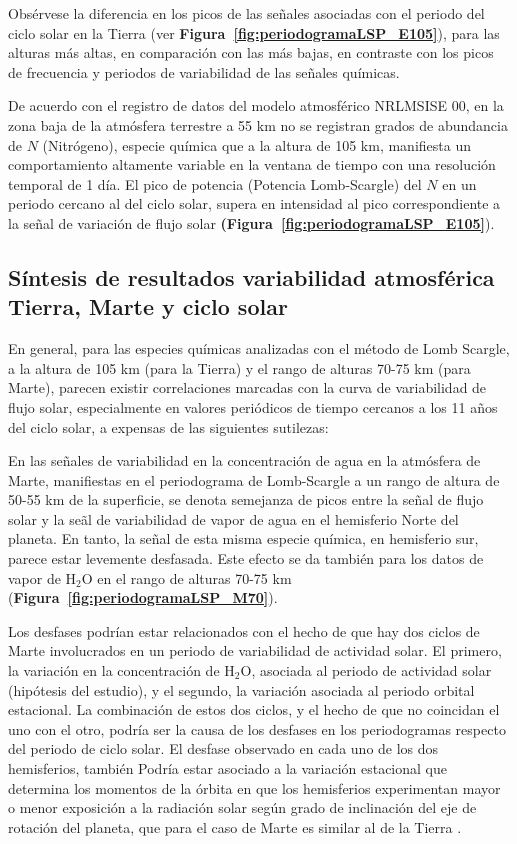 \documentclass[a4paper,alpha-refs]{eSpectra}
\begin{document}
Obs\'ervese la diferencia en los picos de las se\~nales asociadas con el periodo del ciclo solar en la Tierra (ver \textbf{Figura~\ref{fig:periodogramaLSP_E105}}), para las alturas m\'as altas, en comparaci\'on con las m\'as bajas, en contraste con los picos de frecuencia y periodos de variabilidad de las se\~nales qu\'imicas.

De acuerdo con el registro de datos del modelo atmosf\'erico NRLMSISE 00, en la zona baja de la atm\'osfera terrestre a 55 km no se registran grados de abundancia de $N$ (Nitrógeno), especie qu\'imica que a la altura de 105 km, manifiesta un comportamiento altamente variable en la ventana de tiempo con una resoluci\'on temporal de 1 d\'ia. El pico de potencia (Potencia Lomb-Scargle) del $N$ en un periodo cercano al del ciclo solar, supera en intensidad al pico correspondiente a la se\~nal de variaci\'on de flujo solar \textbf{(Figura~\ref{fig:periodogramaLSP_E105}}).


\subsection{S\'intesis de resultados variabilidad atmosf\'erica Tierra, Marte y ciclo solar}


En general, para las especies qu\'imicas analizadas con el m\'etodo de Lomb Scargle, a la altura de 105 km (para la Tierra) y el rango de alturas 70-75 km (para Marte), parecen existir correlaciones marcadas con la curva de variabilidad de flujo solar, especialmente en valores peri\'odicos de tiempo cercanos a los 11 a\~nos del ciclo solar, a expensas de las siguientes sutilezas: 

En las se\~nales de variabilidad en la concentraci\'on de agua en la atm\'osfera de Marte, manifiestas en el periodograma de Lomb-Scargle a un rango de altura de 50-55 km de la superficie, se denota semejanza de picos entre la se\~nal de flujo solar y la se\~al de variabilidad de vapor de agua en el hemisferio Norte del planeta. En tanto, la se\~nal de esta misma especie qu\'imica, en hemisferio sur, parece estar levemente desfasada. Este efecto se da tambi\'en para los datos de vapor de H$_2$O en el rango de alturas 70-75 km (\textbf{Figura~\ref{fig:periodogramaLSP_M70}}).

Los desfases podr\'ian estar relacionados con el hecho de que hay dos ciclos de Marte involucrados  en un periodo de variabilidad de actividad solar. El primero, la variación en la concentración de H$_2$O, asociada al periodo de actividad solar (hipótesis del estudio), y el segundo, la variación asociada al periodo orbital estacional. La combinación de estos dos ciclos, y el hecho de que no coincidan el uno con el otro, podría ser la causa de los desfases en los periodogramas respecto del periodo de ciclo solar. El desfase observado en cada uno de los dos hemisferios, también Podr\'ia estar asociado a la variaci\'on estacional que determina los momentos de la \'orbita en que los hemisferios experimentan mayor o menor exposici\'on a la radiaci\'on solar seg\'un grado de inclinaci\'on del eje de rotaci\'on del planeta, que para el caso de Marte es similar al de la Tierra \citep{Mars_sheet}.
\end{document}
